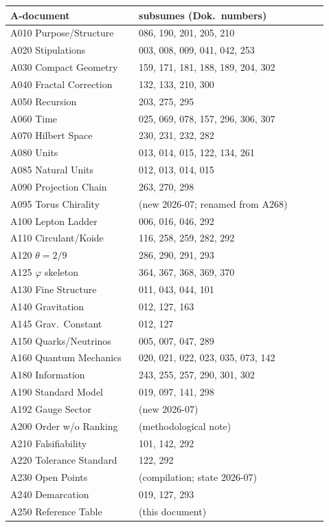 \begin{center}
\small
\begin{longtable}{@{}p{0.38\linewidth}p{0.56\linewidth}@{}}
\hline
A-document & subsumes (Dok.\ numbers) \\
\hline
\endhead
A010 Purpose/Structure   & 086, 190, 201, 205, 210 \\
A020 Stipulations        & 003, 008, 009, 041, 042, 253 \\
A030 Compact Geometry    & 159, 171, 181, 188, 189, 204, 302 \\
A040 Fractal Correction  & 132, 133, 210, 300 \\
A050 Recursion           & 203, 275, 295 \\
A060 Time                & 025, 069, 078, 157, 296, 306, 307 \\
A070 Hilbert Space       & 230, 231, 232, 282 \\
A080 Units               & 013, 014, 015, 122, 134, 261 \\
A085 Natural Units       & 012, 013, 014, 015 \\
A090 Projection Chain    & 263, 270, 298 \\
A095 Torus Chirality     & (new 2026-07; renamed from A268) \\
A100 Lepton Ladder       & 006, 016, 046, 292 \\
A110 Circulant/Koide     & 116, 258, 259, 282, 292 \\
A120 $\theta=2/9$        & 286, 290, 291, 293 \\
A125 $\varphi$ skeleton    & 364, 367, 368, 369, 370 \\
A130 Fine Structure      & 011, 043, 044, 101 \\
A140 Gravitation         & 012, 127, 163 \\
A145 Grav.\ Constant     & 012, 127 \\
A150 Quarks/Neutrinos    & 005, 007, 047, 289 \\
A160 Quantum Mechanics   & 020, 021, 022, 023, 035, 073, 142 \\
A180 Information         & 243, 255, 257, 290, 301, 302 \\
A190 Standard Model      & 019, 097, 141, 298 \\
A192 Gauge Sector        & (new 2026-07) \\
A200 Order w/o Ranking   & (methodological note) \\
A210 Falsifiability      & 101, 142, 292 \\
A220 Tolerance Standard  & 122, 292 \\
A230 Open Points         & (compilation; state 2026-07) \\
A240 Demarcation         & 019, 127, 293 \\
A250 Reference Table     & (this document) \\
\hline
\end{longtable}
\end{center}

